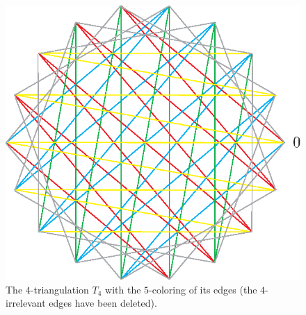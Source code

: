 \documentclass[12pt]{amsart}
\begin{document}
\begin{figure}
\centerline{\includegraphics[scale=1]{18-gon.eps}}
\caption{\small{The $4$-triangulation $T_4$ with the $5$-coloring of its edges (the $4$-irrelevant edges have been deleted).}}\label{10-gon}
\end{figure}
\end{document}
